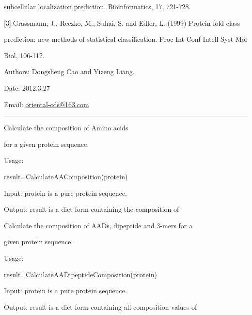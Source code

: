 \documentclass[letterpaper,10pt,english]{sphinxmanual}
\begin{document}
subcellular localization prediction. Bioinformatics, 17, 721-728.

{[}3{]}:Grassmann, J., Reczko, M., Suhai, S. and Edler, L. (1999) Protein fold class

prediction: new methods of statistical classification. Proc Int Conf Intell Syst Mol

Biol, 106-112.

Authors: Dongsheng Cao and Yizeng Liang.

Date: 2012.3.27

Email: \href{mailto:oriental-cds@163.com}{oriental-cds@163.com}


\bigskip\hrule{}\bigskip


\begin{fulllineitems}
\label{reference/AAComposition:AAComposition.CalculateAAComposition}
Calculate the composition of Amino acids

for a given protein sequence.

Usage:

result=CalculateAAComposition(protein)

Input: protein is a pure protein sequence.

Output: result is a dict form containing the composition of

\end{fulllineitems}


\begin{fulllineitems}
\label{reference/AAComposition:AAComposition.CalculateAADipeptideComposition}
Calculate the composition of AADs, dipeptide and 3-mers for a

given protein sequence.

Usage:

result=CalculateAADipeptideComposition(protein)

Input: protein is a pure protein sequence.

Output: result is a dict form containing all composition values of

\end{fulllineitems}
\end{document}
